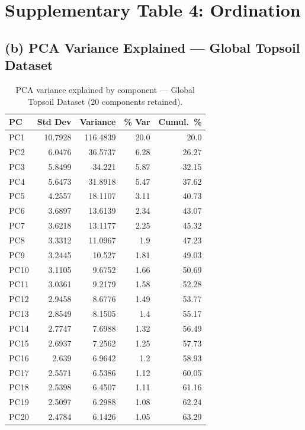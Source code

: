 \documentclass[12pt, oneside]{report}
\begin{document}
\section*{Supplementary Table 4: Ordination}
\label{supp:tab4}

\subsection*{(b) PCA Variance Explained --- Global Topsoil Dataset}

\begin{table}[H]
\centering
\caption[PCA variance --- Global Topsoil]{PCA variance explained by component --- Global Topsoil Dataset (20 components retained).}
\label{tab:supp4a}
\small
\begin{tabular}{lrrrr}
\toprule
\textbf{PC} & \textbf{Std Dev} & \textbf{Variance} & \textbf{\% Var} & \textbf{Cumul.\ \%} \\
\midrule
PC1 & 10.7928 & 116.4839 & 20.0 & 20.0 \\
PC2 & 6.0476 & 36.5737 & 6.28 & 26.27 \\
PC3 & 5.8499 & 34.221 & 5.87 & 32.15 \\
PC4 & 5.6473 & 31.8918 & 5.47 & 37.62 \\
PC5 & 4.2557 & 18.1107 & 3.11 & 40.73 \\
PC6 & 3.6897 & 13.6139 & 2.34 & 43.07 \\
PC7 & 3.6218 & 13.1177 & 2.25 & 45.32 \\
PC8 & 3.3312 & 11.0967 & 1.9 & 47.23 \\
PC9 & 3.2445 & 10.527 & 1.81 & 49.03 \\
PC10 & 3.1105 & 9.6752 & 1.66 & 50.69 \\
PC11 & 3.0361 & 9.2179 & 1.58 & 52.28 \\
PC12 & 2.9458 & 8.6776 & 1.49 & 53.77 \\
PC13 & 2.8549 & 8.1505 & 1.4 & 55.17 \\
PC14 & 2.7747 & 7.6988 & 1.32 & 56.49 \\
PC15 & 2.6937 & 7.2562 & 1.25 & 57.73 \\
PC16 & 2.639 & 6.9642 & 1.2 & 58.93 \\
PC17 & 2.5571 & 6.5386 & 1.12 & 60.05 \\
PC18 & 2.5398 & 6.4507 & 1.11 & 61.16 \\
PC19 & 2.5097 & 6.2988 & 1.08 & 62.24 \\
PC20 & 2.4784 & 6.1426 & 1.05 & 63.29 \\
\bottomrule
\end{tabular}
\end{table}
\end{document}
